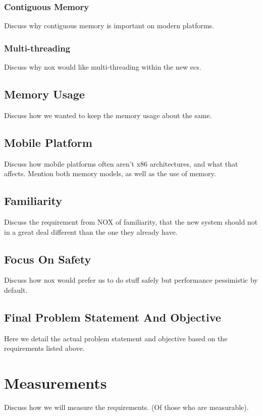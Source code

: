 \subsection{Contiguous Memory}
Discuss why contiguous memory is important on modern platforms.

\subsection{Multi-threading}
Discuss why nox would like multi-threading within the new ecs.

\section{Memory Usage}
Discuss how we wanted to keep the memory usage about the same.

\section{Mobile Platform}
Discuss how mobile platforms often aren't x86 architectures, and what that affects.
Mention both memory models, as well as the use of memory.

\section{Familiarity}
Discuss the requirement from NOX of familiarity, that the new system should not in a great deal different
than the one they already have.

\section{Focus On Safety}
Discuss how nox would prefer us to do stuff safely but performance pessimistic by default.

\section{Final Problem Statement And Objective}
Here we detail the actual problem statement and objective based on the requirements listed above.

\chapter{Measurements}
\label{chap:measurements}
Discuss how we will measure the requirements. (Of those who are measurable).

